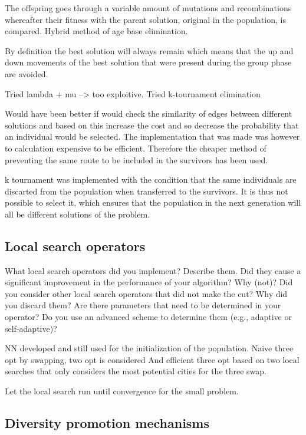 \documentclass[a4paper,10pt]{article}
\newcommand{\ReplaceMe}[1]{{\color{blue}#1}}
\begin{document}
The offspring goes through a variable amount of mutations and recombinations whereafter their fitness with the parent solution, original in the population, is compared. Hybrid method of age base elimination.

By definition the best solution will always remain which means that the up and down movements of the best solution that were present during the group phase are avoided.  

Tried lambda + mu --> too exploitive. 
Tried k-tournament elimination

Would have been better if would check the similarity of edges between different solutions and based on this increase the cost and so decrease the probability that an individual would be selected. The implementation that was made was however to calculation expensive to be efficient. Therefore the cheaper method of preventing the same route to be included in the survivors has been used. 

k tournament was implemented with the condition that the same individuals are discarted from the population when transferred to the survivors. It is thus not possible to select it, which ensures that the population in the next generation will all be different solutions of the problem. 

\subsection{Local search operators}

\ReplaceMe{What local search operators did you implement? Describe them. Did they cause a significant improvement in the performance of your algorithm? Why (not)? Did you consider other local search operators that did not make the cut? Why did you discard them? Are there parameters that need to be determined in your operator? Do you use an advanced scheme to determine them (e.g., adaptive or self-adaptive)?}

NN developed and still used for the initialization of the population.
Naive three opt by swapping, two opt is considered
And efficient three opt based on two local searches that only considers the most potential cities for the three swap. 

Let the local search run until convergence for the small problem. 

\subsection{Diversity promotion mechanisms}
\end{document}
